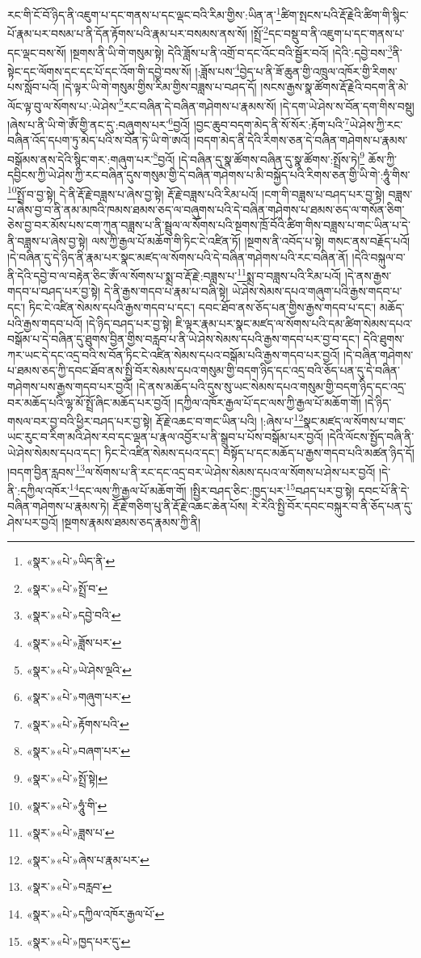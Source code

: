 རང་གི་ངོ་བོ་ཉིད་ནི་འཇུག་པ་དང་གནས་པ་དང་ལྡང་བའི་རིམ་གྱིས་:ཡིན་ན་\footnote{«སྣར་»«པེ་»ཡིད་ནི་}ཚིག་སྤངས་པའི་རྡོ་རྗེའི་ཚིག་གི་སྙིང་པོ་རྣམ་པར་བསམ་པ་ནི་དོན་རྟོགས་པའི་རྣམ་པར་བསམས་ནས་སོ། །སྤྲོ་\footnote{«སྣར་»«པེ་»སྤྲོ་བ་}དང་བསྡུ་བ་ནི་འཇུག་པ་དང་གནས་པ་དང་ལྡང་བས་སོ། །སྔགས་ནི་ཡི་གེ་གསུམ་སྟེ། དེའི་ཟློས་པ་ནི་འགྲོ་བ་དང་འོང་བའི་སྦྱོར་བའོ། །དེའི་:དབྱེ་བས་\footnote{«སྣར་»«པེ་»དབྱེ་བའི་}ནི་སྟེང་དང་ལོགས་དང་དང་པོ་དང་འོག་གི་དབྱེ་བས་སོ། །:ཟློས་པས་\footnote{«སྣར་»«པེ་»ཟློས་པར་}བྱེད་པ་ནི་ཟོ་ཆུན་གྱི་འཁྲུལ་འཁོར་གྱི་རིགས་པས་སློབ་པའོ། །དེ་ལྟར་ཡི་གེ་གསུམ་གྱིས་རིམ་གྱིས་བཟླས་པ་བཤད་དོ། །སངས་རྒྱས་སྣ་ཚོགས་རྡོ་རྗེའི་བདག་ནི་མེ་ལོང་ལྟ་བུ་ལ་སོགས་པ་:ཡེ་ཤེས་\footnote{«སྣར་»«པེ་»ཡེ་ཤེས་ལྔའི་}རང་བཞིན་དེ་བཞིན་གཤེགས་པ་རྣམས་སོ། །དེ་དག་ཡེ་ཤེས་ས་བོན་དག་གིས་བསྡུ། །ཞེས་པ་ནི་ཡི་གེ་ཨོཾ་གྱི་ནང་དུ་:བཞུགས་པར་\footnote{«སྣར་»«པེ་»གཞུག་པར་}བྱའོ། །བྱང་ཆུབ་བདག་མེད་ནི་སོ་སོར་:རྟོག་པའི་\footnote{«སྣར་»«པེ་»རྟོགས་པའི་}ཡེ་ཤེས་ཀྱི་རང་བཞིན་འོད་དཔག་ཏུ་མེད་པའི་ས་བོན་ཏེ་ཡི་གེ་ཨའོ། །བདག་མེད་ནི་དེའི་རིགས་ཅན་དེ་བཞིན་གཤེགས་པ་རྣམས་བསྒོམས་ནས་དེའི་སྙིང་གར་:གཞུག་པར་\footnote{«སྣར་»«པེ་»བཞག་པར་}བྱའོ། །དེ་བཞིན་དུ་སྣ་ཚོགས་བཞིན་དུ་སྣ་ཚོགས་:སྤྲོས་ཏེ།\footnote{«སྣར་»«པེ་»སྤྲོ་སྟེ།} ཆོས་ཀྱི་དབྱིངས་ཀྱི་ཡེ་ཤེས་ཀྱི་རང་བཞིན་དུས་གསུམ་གྱི་དེ་བཞིན་གཤེགས་པ་མི་བསྐྱོད་པའི་རིགས་ཅན་གྱི་ཡི་གེ་:ཧཱུཾ་གིས་\footnote{«སྣར་»«པེ་»ཧཱུཾ་གི་}སྤྲོ་བ་བྱ་སྟེ། དེ་ནི་རྡོ་རྗེ་བཟླས་པ་ཞེས་བྱ་སྟེ། རྡོ་རྗེ་བཟླས་པའི་རིམ་པའོ། །ངག་གི་བཟླས་པ་བཤད་པར་བྱ་སྟེ། བཟླས་པ་ཞེས་བྱ་བ་ནི་ནམ་མཁའི་ཁམས་ཐམས་ཅད་ལ་བཞུགས་པའི་དེ་བཞིན་གཤེགས་པ་ཐམས་ཅད་ལ་གསོན་ཅིག་ཅེས་བྱ་བར་མོས་པས་ངག་ཀུན་བཟླས་པ་ནི་སྦྲུལ་ལ་སོགས་པའི་སྔགས་ཁྲོ་བོའི་ཚིག་གིས་བཟླས་པ་གང་ཡིན་པ་དེ་ནི་བཟླས་པ་ཞེས་བྱ་སྟེ། ལས་ཀྱི་རྒྱལ་པོ་མཆོག་གི་ཏིང་ངེ་འཛིན་ཏོ། །སྔགས་ནི་འབོད་པ་སྟེ། གསང་ནས་བརྗོད་པའོ། །དེ་བཞིན་དུ་དེ་ཉིད་ནི་རྣམ་པར་སྣང་མཛད་ལ་སོགས་པའི་དེ་བཞིན་གཤེགས་པའི་རང་བཞིན་ནོ། །དེའི་བསྐུལ་བ་ནི་དེའི་དབྱེ་བ་ལ་བརྟེན་ཅིང་ཨོཾ་ལ་སོགས་པ་སྨྲ་བ་རྡོ་རྗེ་:བཟླས་པ་\footnote{«སྣར་»«པེ་»ཟླས་པ་}སྨྲ་བ་བཟླས་པའི་རིམ་པའོ། །དེ་ནས་རྒྱས་གདབ་པ་བཤད་པར་བྱ་སྟེ། དེ་ནི་རྒྱས་གདབ་པ་རྣམ་པ་བཞི་སྟེ། ཡེ་ཤེས་སེམས་དཔའ་གཞུག་པའི་རྒྱས་གདབ་པ་དང་། ཏིང་ངེ་འཛིན་སེམས་དཔའི་རྒྱས་གདབ་པ་དང་། དབང་ཐོབ་ནས་ཅོད་པན་གྱིས་རྒྱས་གདབ་པ་དང་། མཆོད་པའི་རྒྱས་གདབ་པའོ། །དེ་ཉིད་བཤད་པར་བྱ་སྟེ། ཇི་ལྟར་རྣམ་པར་སྣང་མཛད་ལ་སོགས་པའི་དམ་ཚིག་སེམས་དཔའ་བསྒོམ་པ་དེ་བཞིན་དུ་ཐུགས་བྱིན་གྱིས་བརླབ་པ་ནི་ཡེ་ཤེས་སེམས་དཔའི་རྒྱས་གདབ་པར་བྱ་བ་དང་། དེའི་ཐུགས་ཀར་ཡང་དེ་དང་འདྲ་བའི་ས་བོན་ཏིང་ངེ་འཛིན་སེམས་དཔའ་བསྒོམ་པའི་རྒྱས་གདབ་པར་བྱའོ། །དེ་བཞིན་གཤེགས་པ་ཐམས་ཅད་ཀྱི་དབང་ཐོབ་ནས་སྤྱི་བོར་སེམས་དཔའ་གསུམ་གྱི་བདག་ཉིད་དང་འདྲ་བའི་ཅོད་པན་དུ་དེ་བཞིན་གཤེགས་པས་རྒྱས་གདབ་པར་བྱའོ། །དེ་ནས་མཆོད་པའི་དུས་སུ་ཡང་སེམས་དཔའ་གསུམ་གྱི་བདག་ཉིད་དང་འདྲ་བར་མཆོད་པའི་ལྷ་མོ་སྤྲོ་ཞིང་མཆོད་པར་བྱའོ། །དཀྱིལ་འཁོར་རྒྱལ་པོ་དང་ལས་ཀྱི་རྒྱལ་པོ་མཆོག་གོ། །དེ་ཉིད་གསལ་བར་བྱ་བའི་ཕྱིར་བཤད་པར་བྱ་སྟེ། རྡོ་རྗེ་འཆང་བ་གང་ཡིན་པའི། །:ཞེས་པ་\footnote{«སྣར་»«པེ་»ཞེས་པ་རྣམ་པར་}སྣང་མཛད་ལ་སོགས་པ་གང་ཡང་རུང་བ་རིག་མའི་ཤེས་རབ་དང་ལྡན་པ་རྣལ་འབྱོར་པ་ནི་སྒྲུབ་པ་པོས་བསྒོམ་པར་བྱའོ། །དེའི་ལོངས་སྤྱོད་བཞི་ནི་ཡེ་ཤེས་སེམས་དཔའ་དང་། ཏིང་ངེ་འཛིན་སེམས་དཔའ་དང་། བསྟོད་པ་དང་མཆོད་པ་རྒྱས་གདབ་པའི་མཚན་ཉིད་དོ། །བདག་བྱིན་རླབས་\footnote{«སྣར་»«པེ་»བརླབ་}ལ་སོགས་པ་ནི་རང་དང་འདྲ་བར་ཡེ་ཤེས་སེམས་དཔའ་ལ་སོགས་པ་ཤེས་པར་བྱའོ། །དེ་ནི་:དཀྱིལ་འཁོར་\footnote{«སྣར་»«པེ་»དཀྱིལ་འཁོར་རྒྱལ་པོ་}དང་ལས་ཀྱི་རྒྱལ་པོ་མཆོག་གོ། །སྤྱིར་བཤད་ཅིང་:ཁྱད་པར་\footnote{«སྣར་»«པེ་»ཁྱད་པར་དུ་}བཤད་པར་བྱ་སྟེ། དབང་པོ་ནི་དེ་བཞིན་གཤེགས་པ་རྣམས་ཏེ། རྡོ་རྗེ་གཅིག་པུ་ནི་རྡོ་རྗེ་འཆང་ཆེན་པོས། རེ་རེའི་སྤྱི་བོར་དབང་བསྐུར་བ་ནི་ཅོད་པན་དུ་ཤེས་པར་བྱའོ། །སྔགས་རྣམས་ཐམས་ཅད་རྣམས་ཀྱི་ནི། 